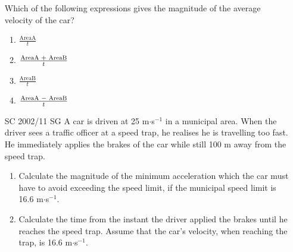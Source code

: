 \begin{enumerate}[noitemsep, label=\textbf{\arabic*}. ]
Which of the following expressions gives the magnitude of the average velocity of the car?
\label{m38796*id82337}\begin{enumerate}[noitemsep, label=\textbf{\alph*}. ] 
            \label{m38796*uid213}\item \begin{math}\frac{\mathrm{Area}\mathrm{A}}{t}\end{math}\label{m38796*uid214}\item \begin{math}\frac{\mathrm{Area}\mathrm{A}\phantom{\rule{0.277778em}{0ex}}+\phantom{\rule{0.277778em}{0ex}}\mathrm{Area}\mathrm{B}}{t}\end{math}\label{m38796*uid215}\item \begin{math}\frac{\mathrm{Area}\mathrm{B}}{t}\end{math}\label{m38796*uid216}\item \begin{math}\frac{\mathrm{Area}\mathrm{A}\phantom{\rule{0.277778em}{0ex}}-\phantom{\rule{0.277778em}{0ex}}\mathrm{Area}\mathrm{B}}{t}\end{math}\end{enumerate}
                \label{m38796*uid217}\item [SC 2002/11 SG] A car is driven at 25 m\begin{math}\ensuremath{\cdot}\end{math}s\begin{math}{}^{-1}\end{math} in a municipal area. When the driver sees a traffic officer at a speed trap, he realises he is travelling too fast. He immediately applies the brakes of the car while still 100 m away from the speed trap.
\label{m38796*id82530}\begin{enumerate}[noitemsep, label=\textbf{\alph*}. ] 
            \label{m38796*uid218}\item Calculate the magnitude of the minimum acceleration which the car must have to avoid exceeding the speed limit, if the municipal speed limit is 16.6 m\begin{math}\ensuremath{\cdot}\end{math}s\begin{math}{}^{-1}\end{math}.
\label{m38796*uid219}\item Calculate the time from the instant the driver applied the brakes until he reaches the speed trap. Assume that the car's velocity, when reaching the trap, is 16.6 m\begin{math}\ensuremath{\cdot}\end{math}s\begin{math}{}^{-1}\end{math}.

\end{enumerate}
\end{enumerate}

